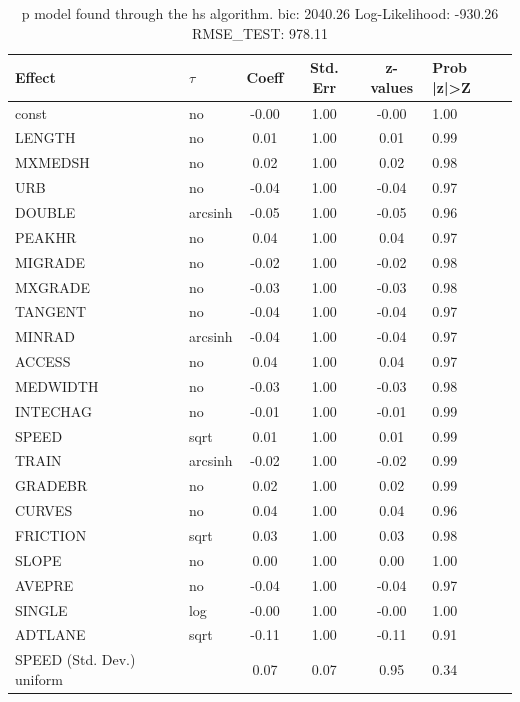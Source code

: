 \begin{table}
	\caption{p model found through the hs algorithm. bic: 2040.26 Log-Likelihood: -930.26 RMSE_TEST: 978.11}
	\begin{center}
		\begin{tabular}{|l|l|c|c|c|l|}
			\hline
			Effect & $\tau$ & Coeff & Std. Err & z-values & Prob |z|>Z \\
			\hline
			const & no & -0.00 & 1.00 & -0.00 & 1.00 \\
			\hline
			LENGTH & no & 0.01 & 1.00 & 0.01 & 0.99 \\
			\hline
			MXMEDSH & no & 0.02 & 1.00 & 0.02 & 0.98 \\
			\hline
			URB & no & -0.04 & 1.00 & -0.04 & 0.97 \\
			\hline
			DOUBLE & arcsinh & -0.05 & 1.00 & -0.05 & 0.96 \\
			\hline
			PEAKHR & no & 0.04 & 1.00 & 0.04 & 0.97 \\
			\hline
			MIGRADE & no & -0.02 & 1.00 & -0.02 & 0.98 \\
			\hline
			MXGRADE & no & -0.03 & 1.00 & -0.03 & 0.98 \\
			\hline
			TANGENT & no & -0.04 & 1.00 & -0.04 & 0.97 \\
			\hline
			MINRAD & arcsinh & -0.04 & 1.00 & -0.04 & 0.97 \\
			\hline
			ACCESS & no & 0.04 & 1.00 & 0.04 & 0.97 \\
			\hline
			MEDWIDTH & no & -0.03 & 1.00 & -0.03 & 0.98 \\
			\hline
			INTECHAG & no & -0.01 & 1.00 & -0.01 & 0.99 \\
			\hline
			SPEED & sqrt & 0.01 & 1.00 & 0.01 & 0.99 \\
			\hline
			TRAIN & arcsinh & -0.02 & 1.00 & -0.02 & 0.99 \\
			\hline
			GRADEBR & no & 0.02 & 1.00 & 0.02 & 0.99 \\
			\hline
			CURVES & no & 0.04 & 1.00 & 0.04 & 0.96 \\
			\hline
			FRICTION & sqrt & 0.03 & 1.00 & 0.03 & 0.98 \\
			\hline
			SLOPE & no & 0.00 & 1.00 & 0.00 & 1.00 \\
			\hline
			AVEPRE & no & -0.04 & 1.00 & -0.04 & 0.97 \\
			\hline
			SINGLE & log & -0.00 & 1.00 & -0.00 & 1.00 \\
			\hline
			ADTLANE & sqrt & -0.11 & 1.00 & -0.11 & 0.91 \\
			\hline
			SPEED (Std. Dev.) uniform &  & 0.07 & 0.07 & 0.95 & 0.34 \\

\end{tabular}
\end{center}
\end{table}
